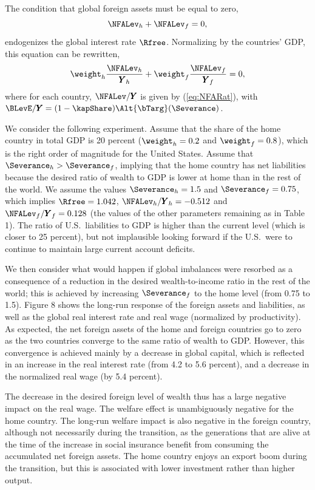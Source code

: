 \documentclass[titlepage]{\econtex}\newcommand{\texname}{cjSOE}
\renewcommand{\GDPLev}{\ensuremath{\pmb{Y}}}
\begin{document}
The condition that global foreign assets must be equal to zero,
\begin{equation*}
\NFALev_h+\NFALev_f=0,
\end{equation*}
endogenizes the global interest rate $\Rfree$. Normalizing by the countries' GDP, this equation can be rewritten,
\begin{equation*}
\weight_h \frac{\NFALev_h}{\GDPLev_h}+\weight_f \frac{\NFALev_f}{\GDPLev_f}=0,
\end{equation*}
where for each country, $\NFALev/\GDPLev$ is given by (\ref{eq:NFARat}), with $\BLevE/\GDPLev=(1-\kapShare)\Alt{\bTarg}(\Severance)$.

We consider the following experiment. Assume that the share of the
home country in total GDP is 20 percent ($\weight_h=0.2$ and
$\weight_f=0.8$), which is the right order of magnitude for the United
States. Assume that $\Severance_h > \Severance_f$, implying that the home
country has net liabilities because the desired ratio of wealth to GDP
is lower at home than in the rest of the world. We assume the values
$\Severance_h=1.5$ and $\Severance_f=0.75$, which implies $\Rfree=1.042$,
$\NFALev_h/\GDPLev_h=-0.512$ and $\NFALev_f/\GDPLev_f=0.128$ (the
values of the other parameters remaining as in Table 1). The ratio of
U.S.\ liabilities to GDP is higher than the current level (which is
closer to 25 percent), but not implausible looking forward if the
U.S.\ were to continue to maintain large current account deficits.

We then consider what would happen if global imbalances were resorbed
as a consequence of a reduction in the desired wealth-to-income ratio in the rest of the
world; this is achieved by increasing $\Severance_f$ to the home level (from 0.75 to
1.5). Figure 8 shows the long-run response of the foreign assets and
liabilities, as well as the global real interest rate and real wage
(normalized by productivity). As expected, the net foreign assets of
the home and foreign countries go to zero as the two countries
converge to the same ratio of wealth to GDP. However, this convergence
is achieved mainly by a decrease in global capital, which is reflected
in an increase in the real interest rate (from 4.2 to 5.6 percent),
and a decrease in the normalized real wage (by 5.4 percent).

The decrease in the desired foreign level of wealth thus has a large negative impact on the real wage. The welfare effect is unambiguously negative for the home country. The long-run welfare impact is also negative in the foreign country, although not necessarily during the transition, as the generations that are alive at the time of the increase in social insurance benefit from consuming the accumulated net foreign assets. The home country enjoys an export boom during the transition, but this is associated with lower investment rather than higher output.
\end{document}
